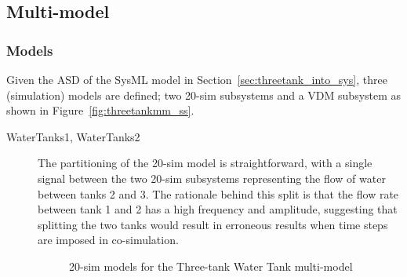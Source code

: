 \subsection{Multi-model}
\label{sec:threetank_into_mm}

\subsubsection{Models}
\label{sec:threetank_into_models}

Given the ASD of the SysML model in  Section~\ref{sec:threetank_into_sys}, three (simulation) models are defined; two 20-sim subsystems and a VDM subsystem as shown in Figure~\ref{fig:threetankmm_ss}.

\begin{description}
\item[WaterTanks1, WaterTanks2] The partitioning of the 20-sim model is straightforward, with a single signal between the two 20-sim subsystems representing the flow of water between tanks 2 and 3. The rationale behind this split is that the flow rate between tank 1 and 2 has a high frequency and amplitude, suggesting that splitting the two tanks would result in erroneous results when time steps are imposed in co-simulation. 

\begin{figure}[htb!]
\begin{center}
\caption{20-sim models for the Three-tank Water Tank multi-model}
\label{fig:threetank_mm_20-sim}
\end{center}
\end{figure}


\end{description}
